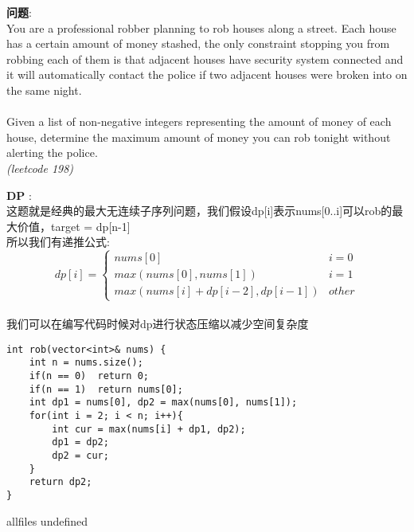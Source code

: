 \documentclass{article}
\begin{document}
\begin{CJK}{UTF8}{gbsn}     %

\else
    
\begin{description}
    \item{\textbf{问题}}: \\
You are a professional robber planning to rob houses along a street. Each house has a certain amount of money stashed, the only constraint stopping you from robbing each of them is that adjacent houses have security system connected and it will automatically contact the police if two adjacent houses were broken into on the same night. \\
\\
Given a list of non-negative integers representing the amount of money of each house, determine the maximum amount of money you can rob tonight without alerting the police. \\
\textit{(leetcode 198)}
    \item{\textbf{DP}} : 
    \\这题就是经典的最大无连续子序列问题，我们假设dp[i]表示nums[0..i]可以rob的最大价值，target = dp[n-1]
	\\所以我们有递推公式:
$$
dp[i] =
\begin{cases} 
nums[0] & i = 0 \\
max(nums[0], nums[1]) & i = 1 \\
max(nums[i] + dp[i-2], dp[i-1]) & other
\end{cases}
$$
	\\我们可以在编写代码时候对dp进行状态压缩以减少空间复杂度
    \begin{lstlisting}
int rob(vector<int>& nums) {
	int n = nums.size();
	if(n == 0)	return 0;
	if(n == 1)	return nums[0];
	int dp1 = nums[0], dp2 = max(nums[0], nums[1]);
	for(int i = 2; i < n; i++){
		int cur = max(nums[i] + dp1, dp2);
		dp1 = dp2;
		dp2 = cur;
	}
	return dp2;
}
    \end{lstlisting}
\end{description}

\fi

\ifx allfiles undefined
\end{CJK}
\end{document}

